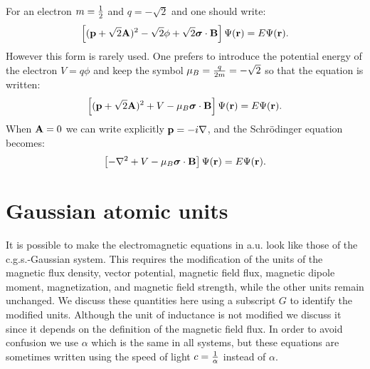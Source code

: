 \documentclass[12pt,a4paper,twoside]{report}
\begin{document}
{{For an electron 
$m={1\over 2}$ and $q=-\sqrt{2}$ and one should write:
\begin{equation}
\left[({\bf p}+ \sqrt{2} {\bf A})^2  
- \sqrt{2} \phi + \sqrt{2}
{\boldsymbol \sigma} \cdot {\bf B} \right]
\Psi({\bf r})= E \Psi({\bf r}).
\end{equation}
However this form is rarely used. One prefers to introduce the potential
energy of the electron $V=q\phi$ and keep the symbol $\mu_B={q \over 2 m}
=-\sqrt{2}$ 
so that the equation is written:
\begin{equation}
\left[({\bf p}+ \sqrt{2} {\bf A})^2  
+ V - \mu_B {\boldsymbol \sigma} \cdot {\bf B} \right]
\Psi({\bf r})= E \Psi({\bf r}).
\end{equation}
When ${\bf A}=0$ we can write explicitly ${\bf p}=-i \nabla$, and
the Schr\"odinger equation becomes:
\begin{equation}
\left[-\nabla^2  
+ V - \mu_B {\boldsymbol \sigma} \cdot {\bf B} \right]
\Psi({\bf r})= E \Psi({\bf r}).
\end{equation}
}
\newpage

{\color{dark-blue}\chapter{Gaussian atomic units}}

{\color{steelblue}
It is possible to make the electromagnetic equations in a.u. look like 
those of the c.g.s.-Gaussian system. This requires the modification of 
the units of the magnetic flux density, vector potential, magnetic field 
flux, magnetic dipole moment, magnetization, and magnetic field strength, 
while the other units remain unchanged. 
We discuss these quantities here using a subscript $G$ to identify the
modified units. Although the unit of inductance is not modified 
we discuss it since it depends on the definition of the magnetic field flux.
In order to avoid confusion we use $\alpha$ which is the same in all
systems, but these equations are sometimes written using the speed of light
$c={1\over \alpha}$ instead of $\alpha$.
\\

}}
\end{document}
